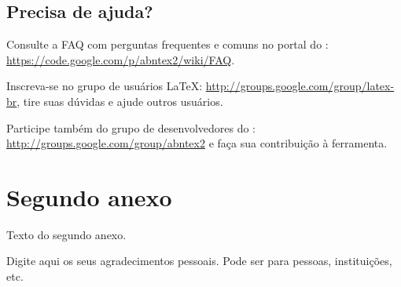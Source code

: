 \documentclass[article,12pt,oneside,a4paper,chapter=TITLE,
			   english,brazil]{abntex2}
\begin{document}
\begin{anexosenv}
\section{Precisa de ajuda?}

Consulte a FAQ com perguntas frequentes e comuns no portal do \abnTeX: \url{https://code.google.com/p/abntex2/wiki/FAQ}.

Inscreva-se no grupo de usuários \LaTeX: \url{http://groups.google.com/group/latex-br}, tire suas dúvidas e ajude outros usuários.

Participe também do grupo de desenvolvedores do \abnTeX: \url{http://groups.google.com/group/abntex2} e faça sua contribuição à ferramenta.
\vspace{\onelineskip}


\chapter{Segundo anexo}

Texto do segundo anexo.

\end{anexosenv}


\newpage
\begin{agradecimentos}
	Digite aqui os seus agradecimentos pessoais. Pode ser para pessoas,
	instituições, etc.
\end{agradecimentos}


\printindex
\end{document}
